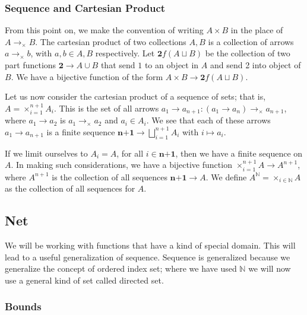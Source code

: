 \documentclass [12pt]{book}
\begin{document}
		\subsubsection{Sequence and Cartesian Product}

From this point on, we make the convention of writing $A\times B$ in the place of $A\rightarrow_\times B$. The cartesian product of two collections $A,B$ is a collection of arrows $a\rightarrow_\times b$, with $a,b\in A,B$ respectively. Let $\textbf{2}f(A\sqcup B)$ be the collection of two part functions $\textbf{2}\rightarrow A\cup B$ that send $1$ to an object in $A$ and send 2 into object of $B$. We have a bijective function of the form $A\times B\rightarrow\textbf{2}f(A\sqcup B)$.

Let us now consider the cartesian product of a sequence of sets; that is, $A=\times_{i=1}^{n+1}A_i$. This is the set of all arrows $a_1\longrightarrow a_{n+1}:(a_1\longrightarrow a_{n})\rightarrow_\times a_{n+1}$, where $a_1\longrightarrow a_{2}$ is $a_1\rightarrow_\times a_{2}$ and $a_i\in A_i$. We see that each of these arrows $a_1\longrightarrow a_{n+1}$ is a finite sequence $\textbf{n+1}\rightarrow\bigsqcup_{i=1}^{n+1}A_i$ with $i\mapsto a_i$.

If we limit ourselves to $A_i=A$, for all $i\in\textbf{n+1}$, then we have a finite sequence on $A$. In making such considerations, we have a bijective function $\times_{i=1}^{n+1}A\rightarrow A^{n+1}$, where $A^{n+1}$ is the collection of all sequences $\textbf{n+1}\rightarrow A$. We define $A^\mathbb{N}=\times_{i\in\mathbb{N}}A$ as the collection of all sequences for $A$.

	\subsection{Net}

We will be working with functions that have a kind of special domain. This will lead to a useful generalization of sequence. Sequence is generalized because we generalize the concept of ordered index set; where we have used $\mathbb{N}$ we will now use a general kind of set called directed set.

		\subsubsection{Bounds}
\end{document}
